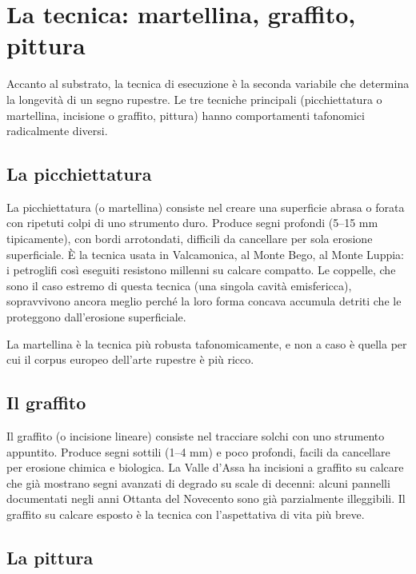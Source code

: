 \section{La tecnica: martellina, graffito, pittura}

Accanto al substrato, la tecnica di esecuzione è la seconda variabile che determina la longevità di un segno rupestre. Le tre tecniche principali (picchiettatura o martellina, incisione o graffito, pittura) hanno comportamenti tafonomici radicalmente diversi.

\subsection{La picchiettatura}

La picchiettatura (o martellina) consiste nel creare una superficie abrasa o forata con ripetuti colpi di uno strumento duro. Produce segni profondi (5--15 mm tipicamente), con bordi arrotondati, difficili da cancellare per sola erosione superficiale. È la tecnica usata in Valcamonica, al Monte Bego, al Monte Luppia: i petroglifi così eseguiti resistono millenni su calcare compatto. Le coppelle, che sono il caso estremo di questa tecnica (una singola cavità emisfericca), sopravvivono ancora meglio perché la loro forma concava accumula detriti che le proteggono dall'erosione superficiale.

La martellina è la tecnica più robusta tafonomicamente, e non a caso è quella per cui il corpus europeo dell'arte rupestre è più ricco.

\subsection{Il graffito}

Il graffito (o incisione lineare) consiste nel tracciare solchi con uno strumento appuntito. Produce segni sottili (1--4 mm) e poco profondi, facili da cancellare per erosione chimica e biologica. La Valle d'Assa ha incisioni a graffito su calcare che già mostrano segni avanzati di degrado su scale di decenni: alcuni pannelli documentati negli anni Ottanta del Novecento sono già parzialmente illeggibili. Il graffito su calcare esposto è la tecnica con l'aspettativa di vita più breve.

\subsection{La pittura}

